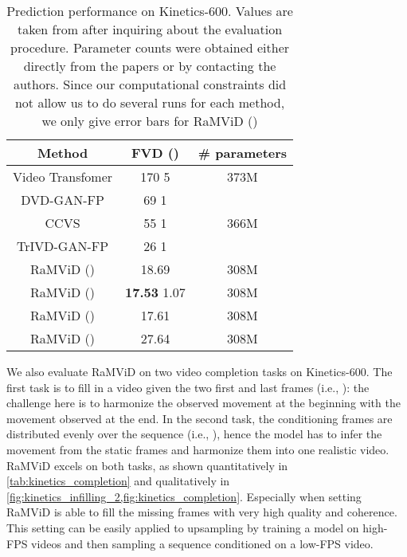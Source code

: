 \documentclass[10pt]{article} \usepackage[accepted]{tmlr}
\begin{document}
\begin{table}
    \centering
    \setlength{\tabcolsep}{6pt}
     \caption{Prediction performance on Kinetics-600. Values are taken from \citet{moing2021ccvs} after inquiring about the evaluation procedure. Parameter counts were obtained either directly from the papers or by contacting the authors. Since our computational constraints did not allow us to do several runs for each method, we only give error bars for RaMViD ()}
    \begin{tabular}{ccc}
        \toprule 
        \textbf{Method} &  \textbf{FVD} () & \textbf{\# parameters} \\
        \midrule

        Video Transfomer \citep{Weissenborn2020Scaling} & 170  5 & 373M \\
        DVD-GAN-FP \citep{clark_2019_dvd_gan} & 69  1 \\
        CCVS \citep{moing2021ccvs} & 55  1 & 366M \\
        TrIVD-GAN-FP \citep{Luc_2020} & 26  1 \\
        \midrule 
        RaMViD () & 18.69  & 308M \\ 
        RaMViD () & \textbf{17.53}  1.07  & 308M \\ 
        RaMViD () & 17.61 & 308M \\ 
        RaMViD () & 27.64 & 308M \\  
        \bottomrule
    \end{tabular}
    \label{tab:kinetics}
\end{table} 

We also evaluate RaMViD on two video completion tasks on Kinetics-600. The first task is to fill in a video given the two first and last frames (i.e., ): the challenge here is to harmonize the observed movement at the beginning with the movement observed at the end. 
In the second task, the conditioning frames are distributed evenly over the sequence (i.e., ), hence the model has to infer the movement from the static frames and harmonize them into one realistic video. RaMViD excels on both tasks, as shown quantitatively in \cref{tab:kinetics_completion} and qualitatively in \cref{fig:kinetics_infilling_2,fig:kinetics_completion}. Especially when setting  RaMViD is able to fill the missing frames with very high quality and coherence. 
This setting can be easily applied to upsampling by training a model on high-FPS videos and then sampling a sequence conditioned on a low-FPS video.
\end{document}
